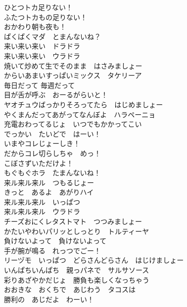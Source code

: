 {ひとつトカ足りない！\\
ふたつトカもの足りない！\\
おかわり朝も夜も！\\
ぱくぱくマダ　とまんないね？\\

来い来い来い　ドラドラ\\
来い来い来い　ウラドラ\\

焼いて炒めて生でそのまま　はさみましょー\\
からいあまいすっぱいミックス　タケリーア\\
毎日だって 毎週だって\\
目が舌が呼ぶ　おーるがらいと！\\
ヤオチュウばっかりそろってたら　はじめましょー\\
やくまんだってあがってなんぼよ　ハラペーニョ\\
充電おわってるじょ　いつでもかかってこい\\
でっかい　たいどで　はーい！\\

いまやコレじょーしき！\\
だからコレ切らしちゃ　めっ！\\
こぼさずいただけよ！\\
もぐもぐホラ　たまんないね！\\

来ル来ル来ル　つもるじょー\\
きっと　あるよ　あがりハイ\\

来ル来ル来ル　いっぱつ\\
来ル来ル来ル　ウラドラ\\

チーズおにくレタストマト　つつみましょー\\
かたいやわいパリッとしっとり　トルティーヤ\\
負けないよって　負けないよって\\
手が腕が鳴る　れっつでごー！\\
リーヅモ　いっぱつ　どらさんどらさん　はじけましょー\\
いんぱちいんぱち　親っパネで　サルサソース\\
彩りあざやかだじょ　勝負も楽しくなっちゃう\\
おおきな　おくちで　あじわう　タコスは\\
勝利の　あじだよ　わーい！
}

